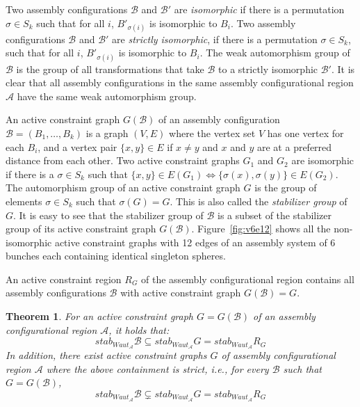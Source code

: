 \documentclass[]{article}
\newtheorem{theorem}{Theorem}[section]
\newcommand{\figref}[1]{Figure~\ref{#1}}
\begin{document}
Two assembly configurations $\mathcal{B}$ and $\mathcal{B}'$ are
\emph{isomorphic} if there is a permutation $\sigma \in S_k$ such that for all
$i$, $B'_{\sigma(i)}$ is isomorphic to $B_i$.  Two assembly configurations
$\mathcal{B}$ and $\mathcal{B}'$ are \emph{strictly isomorphic}, if there is a
permutation $\sigma \in S_k$, such that for all $i$, $B'_{\sigma(i)}$ is
isomorphic to $B_i$. The weak automorphism group of $\mathcal{B}$ is the group
of all transformations that take $\mathcal{B}$ to a strictly isomorphic
$\mathcal{B}'$. It is clear that all assembly configurations in the same
assembly configurational region $\mathcal{A}$ have the same weak automorphism
group.


An active constraint graph $G(\mathcal{B})$ of an assembly configuration
$\mathcal{B} = (B_1, \dots, B_k)$ is a graph $(V, E)$ where the vertex set $V$
has one vertex for each $B_i$, and a vertex pair $\{x, y\} \in E$ if $x \ne y$
and $x$ and $y$ are at a preferred distance from each other. Two active
constraint graphs $G_1$ and $G_2$ are isomorphic if there is a $\sigma \in S_k$
such that $\{x, y\} \in E(G_1) \Leftrightarrow \{\sigma(x), \sigma(y)\} \in
E(G_2)$. The automorphism group of an active constraint graph $G$ is the group
of elements $\sigma \in S_k$ such that $\sigma(G) = G$. This is also called the
\emph{stabilizer group} of $G$. It is easy to see that the stabilizer group of
$\mathcal{B}$ is a subset of the stabilizer group of its active constraint
graph $G(\mathcal{B})$.  \figref{fig:v6e12} shows all the non-isomorphic active
constraint graphs with 12 edges of an assembly system of 6 bunches each
containing identical singleton spheres.


An active constraint region $R_G$ of the assembly configurational region contains 
all assembly  configurations $\mathcal{B}$ with active constraint graph 
$G(\mathcal{B}) = G$.


\begin{theorem}
\label{thm:symmetry}
\cite{sym8010005} For an active constraint graph $G = G(\mathcal{B})$ of an assembly configurational
region 
$\mathcal{A}$, it holds that:
$$stab_{Waut_\mathcal{A}} \mathcal{B}  \subseteq stab_{Waut_\mathcal{A}} G = stab_{Waut_\mathcal{A}} R_G$$
In addition, there exist active constraint graphs $G$ of assembly configurational region 
$\mathcal{A}$ where the above containment is strict, i.e.,
for every $\mathcal{B}$ such that $G=G(\mathcal{B})$,  
$$stab_{Waut_\mathcal{A}} \mathcal{B}  \subsetneq stab_{Waut_\mathcal{A}} G = 
stab_{Waut_\mathcal{A}} R_G$$
\end{theorem}
\end{document}
